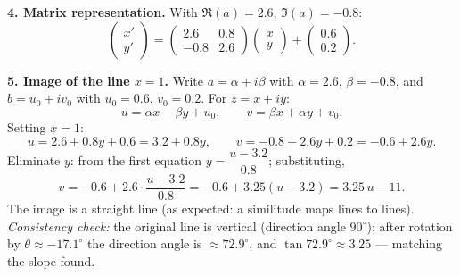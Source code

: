 \documentclass[11pt]{article}
\begin{document}
\begin{exoresolu}
\textbf{4. Matrix representation.}
With $\Re(a)=2.6$, $\Im(a)=-0.8$:
\[
\boxed{\begin{pmatrix} x' \\ y' \end{pmatrix} = \begin{pmatrix} 2.6 & 0.8 \\ -0.8 & 2.6 \end{pmatrix} \begin{pmatrix} x \\ y \end{pmatrix} + \begin{pmatrix} 0.6 \\ 0.2 \end{pmatrix}}.
\]

\textbf{5. Image of the line $x=1$.}
Write $a=\alpha+i\beta$ with $\alpha=2.6$, $\beta=-0.8$, and $b = u_0+iv_0$ with $u_0=0.6$, $v_0=0.2$. For $z=x+iy$:
\[
u = \alpha x - \beta y + u_0, \qquad v = \beta x + \alpha y + v_0.
\]
Setting $x=1$:
\[
u = 2.6 + 0.8y + 0.6 = 3.2 + 0.8y, \qquad v = -0.8 + 2.6y + 0.2 = -0.6 + 2.6y.
\]
Eliminate $y$: from the first equation $y = \dfrac{u-3.2}{0.8}$; substituting,
\[
v = -0.6 + 2.6\cdot\frac{u-3.2}{0.8} = -0.6 + 3.25(u-3.2) = \boxed{3.25\,u - 11}.
\]
The image is a straight line (as expected: a similitude maps lines to lines). \emph{Consistency check:} the original line is vertical (direction angle $90^\circ$); after rotation by $\theta\approx-17.1^\circ$ the direction angle is $\approx 72.9^\circ$, and $\tan 72.9^\circ \approx 3.25$ — matching the slope found.
\end{exoresolu}
\end{document}
